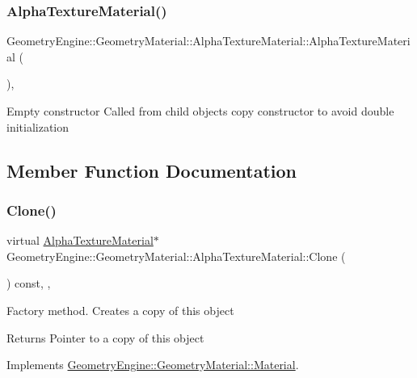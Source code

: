 \subsubsection{\texorpdfstring{AlphaTextureMaterial()}{AlphaTextureMaterial()}\hspace{0.1cm}{\footnotesize\ttfamily [3/3]}}
{\footnotesize\ttfamily Geometry\+Engine\+::\+Geometry\+Material\+::\+Alpha\+Texture\+Material\+::\+Alpha\+Texture\+Material (\begin{DoxyParamCaption}{ }\end{DoxyParamCaption})\hspace{0.3cm}{\ttfamily [inline]}, {\ttfamily [protected]}}

Empty constructor Called from child objects copy constructor to avoid double initialization 

\subsection{Member Function Documentation}
\mbox{\label{class_geometry_engine_1_1_geometry_material_1_1_alpha_texture_material_a27375f0008fcdeaacb49fb4266f9f480}} 
\subsubsection{\texorpdfstring{Clone()}{Clone()}}
{\footnotesize\ttfamily virtual \mbox{\hyperlink{class_geometry_engine_1_1_geometry_material_1_1_alpha_texture_material}{Alpha\+Texture\+Material}}$\ast$ Geometry\+Engine\+::\+Geometry\+Material\+::\+Alpha\+Texture\+Material\+::\+Clone (\begin{DoxyParamCaption}{ }\end{DoxyParamCaption}) const\hspace{0.3cm}{\ttfamily [inline]}, {\ttfamily [override]}, {\ttfamily [virtual]}}

Factory method. Creates a copy of this object \begin{DoxyReturn}{Returns}
Pointer to a copy of this object 
\end{DoxyReturn}


Implements \mbox{\hyperlink{class_geometry_engine_1_1_geometry_material_1_1_material_ae5513ff06d536365e18ddc5e07e79784}{Geometry\+Engine\+::\+Geometry\+Material\+::\+Material}}.



